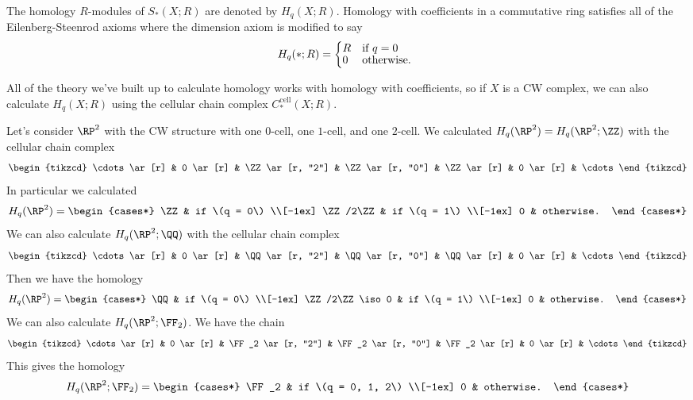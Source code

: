 \documentclass{standalone}
\begin{document}
The homology \(R\)-modules of \(S_*(X; R)\) are denoted by \(H_q(X; R)\).
Homology with coefficients in a commutative ring satisfies all of
the Eilenberg-Steenrod axioms where the dimension axiom is modified to say
\[
  H_q(*; R) = \begin{cases*}
    R & if \(q = 0\) \\[-1ex]
    0 & otherwise.
  \end{cases*}
\]

All of the theory we've built up to calculate homology works with
homology with coefficients, so if \(X\) is a CW complex,
we can also calculate \(H_q(X; R)\) using the cellular chain complex
\(C^{\text{cell}}_*(X; R)\).

\begin{example}
  Let's consider \(\RP^2\) with the CW structure with
    one \(0\)-cell,
    one \(1\)-cell, and
    one \(2\)-cell.
  We calculated \(H_q(\RP^2) = H_q(\RP^2; \ZZ)\) with the
  cellular chain complex
  \[
    \begin{tikzcd}
    	\cdots \ar[r] &
    	0 \ar[r] &
    	\ZZ \ar[r, "2"] &
    	\ZZ \ar[r, "0"] &
    	\ZZ \ar[r] &
    	0 \ar[r] &
    	\cdots
    \end{tikzcd}
  \]
  In particular we calculated
  \[
    H_q(\RP^2) = \begin{cases*}
      \ZZ & if \(q = 0\) \\[-1ex]
      \ZZ/2\ZZ & if \(q = 1\) \\[-1ex] %
      0 & otherwise.
    \end{cases*}
  \]
  We can also calculate \(H_q(\RP^2; \QQ)\) with the cellular chain complex
  \[
    \begin{tikzcd}
    	\cdots \ar[r] &
    	0 \ar[r] &
    	\QQ \ar[r, "2"] &
    	\QQ \ar[r, "0"] &
    	\QQ \ar[r] &
    	0 \ar[r] &
    	\cdots
    \end{tikzcd}
  \]
  Then we have the homology
  \[
    H_q(\RP^2) = \begin{cases*}
      \QQ & if \(q = 0\) \\[-1ex]
      \ZZ/2\ZZ \iso 0 & if \(q = 1\) \\[-1ex] %
      0 & otherwise.
    \end{cases*}
  \]
  We can also calculate \(H_q(\RP^2; \FF_2)\). We have the chain
  \[
    \begin{tikzcd}
    	\cdots \ar[r] &
    	0 \ar[r] &
    	\FF_2 \ar[r, "2"] &
    	\FF_2 \ar[r, "0"] &
    	\FF_2 \ar[r] &
    	0 \ar[r] &
    	\cdots
    \end{tikzcd}
  \]
  This gives the homology
  \[
    H_q(\RP^2; \FF_2) = \begin{cases*}
      \FF_2 & if \(q = 0, 1, 2\) \\[-1ex]
      0 & otherwise.
    \end{cases*}
  \]
\end{example}
\end{document}
